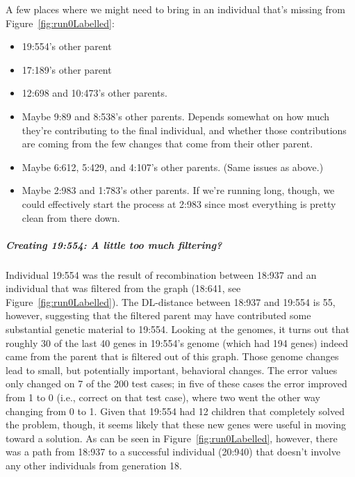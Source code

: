 A few places where we might need to bring in an individual that's 
missing from Figure~\ref{fig:run0Labelled}:
\begin{itemize}
	\item 19:554's other parent
	\item 17:189's other parent
	\item 12:698 and 10:473's other parents.
	\item Maybe 9:89 and 8:538's other parents. Depends somewhat on how much
	they're contributing to the final individual, and whether those 
	contributions are coming from the few changes that come from their other
	parent.
	\item Maybe 6:612, 5:429, and 4:107's other parents. (Same issues as above.)
	\item Maybe 2:983 and 1:783's other parents. If we're running long, though, 
	we could effectively start the process at 2:983 since most everything is
	pretty clean from there down.
\end{itemize}


\subparagraph{Creating 19:554: A little too much filtering?}

Individual 19:554 was the result of 
recombination between 18:937 and an individual that was filtered from the
graph (18:641, see Figure~\ref{fig:run0Labelled}). 
The DL-distance between 18:937 and 19:554 is 55, however,
suggesting that the filtered parent may have contributed some substantial
genetic material to 19:554. Looking at the genomes, it turns out that 
roughly 30 of the last 40 genes in 19:554's genome (which had 194 genes) 
indeed came from the parent that is filtered out of this graph. Those genome
changes lead to small, but potentially important, behavioral changes. 
The error values only 
changed on 7 of the 200 test cases; in five of these cases the error improved
from 1 to 0 (i.e., correct on that test case), where two went the other way
changing from 0 to 1. Given that 19:554 had 12 children that completely
solved the problem, though, it seems likely that these new genes were useful
in moving toward a solution. As can be seen in Figure~\ref{fig:run0Labelled},
however, there was a path from 18:937 to a successful individual (20:940)
that doesn't involve any other individuals from generation 18.

